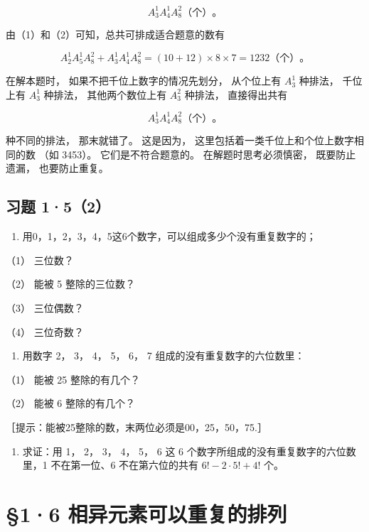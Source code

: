 \[
A_3^1A_4^1A_8^2\text{（个）}\text{。}
\]

由（1）和（2）可知，总共可排成适合题意的数有

\[
A_2^1A_5^1A_8^2+A_3^1A_4^1A_8^2=(10+12)\times8\times7=1232\text{（个）}\text{。}
\]


在解本题时， 如果不把千位上数字的情况先划分， 从个位上有 \(A_{3}^{1}\)
种排法， 千位上有 \(A_{3}^{1}\) 种排法， 其他两个数位上有 \(A_{3}^{2}\)
种排法， 直接得出共有

\[
A_3^1A_4^1A_8^2\text{（个）}\text{。}
\]

种不同的排法， 那末就错了。 这是因为，
这里包括着一类千位上和个位上数字相同的数 （如 3453）。
它们是不符合题意的。 在解题时思考必须慎密， 既要防止遗漏，
也要防止重复。

\subsection{习题 1·5（2）}

\begin{enumerate}
\item
  用0，1，2，3，4，5这6个数字，可以组成多少个没有重复数字的；
\end{enumerate}

（1） 三位数？

（2） 能被 5 整除的三位数？

（3） 三位偶数？

（4） 三位奇数？

\begin{enumerate}[start=2]
\item
  用数字 2， 3， 4， 5， 6， 7 组成的没有重复数字的六位数里：
\end{enumerate}

（1） 能被 25 整除的有几个？

（2） 能被 6 整除的有几个？

［提示：能被25整除的数，末两位必须是00，25，50，75.］

\begin{enumerate}[start=3]
\item
  求证：用 1， 2， 3， 4， 5， 6 这 6
  个数字所组成的没有重复数字的六位数里，1 不在第一位、6 不在第六位的共有
  \(6! - 2 \cdot 5! + 4!\) 个。
\end{enumerate}

\section{§1·6 相异元素可以重复的排列}

